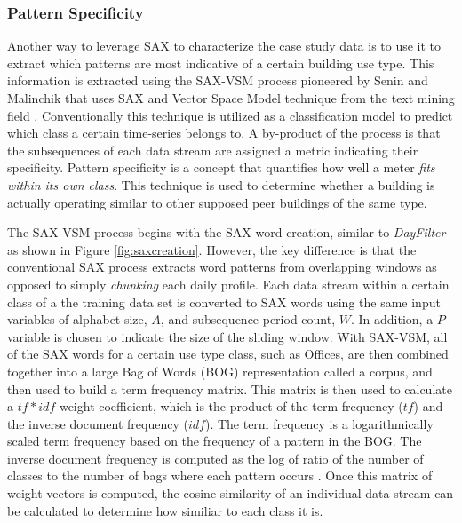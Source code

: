\subsubsection{Pattern Specificity}
\label{sec:patternspec}

Another way to leverage SAX to characterize the case study data is to use it to extract which patterns are most indicative of a certain building use type. This information is extracted using the SAX-VSM process pioneered by Senin and Malinchik that uses SAX and Vector Space Model technique from the text mining field \cite{Senin_2013}. Conventionally this technique is utilized as a classification model to predict which class a certain time-series belongs to. A by-product of the process is that the subsequences of each data stream are assigned a metric indicating their specificity. Pattern specificity is a concept that quantifies how well a meter \emph{fits within its own class}. This technique is used to determine whether a building is actually operating similar to other supposed peer buildings of the same type.

The SAX-VSM process begins with the SAX word creation, similar to \emph{DayFilter} as shown in Figure \ref{fig:saxcreation}. However, the key difference is that the conventional SAX process extracts word patterns from overlapping windows as opposed to simply \emph{chunking} each daily profile. Each data stream within a certain class of a the training data set is converted to SAX words using the same input variables of alphabet size, $A$, and subsequence period count, $W$. In addition, a $P$ variable is chosen to indicate the size of the sliding window. With SAX-VSM, all of the SAX words for a certain use type class, such as Offices, are then combined together into a large Bag of Words (BOG) representation called a corpus, and then used to build a term frequency matrix. This matrix is then used to calculate a $tf*idf$ weight coefficient, which is the product of the term frequency ($tf$) and the inverse document frequency ($idf$). The term frequency is a logarithmically scaled term frequency based on the frequency of a pattern in the BOG. The inverse document frequency is computed as the log of ratio of the number of classes to the number of bags where each pattern occurs \cite{Manning}. Once this matrix of weight vectors is computed, the cosine similarity of an individual data stream can be calculated to determine how similiar to each class it is. 